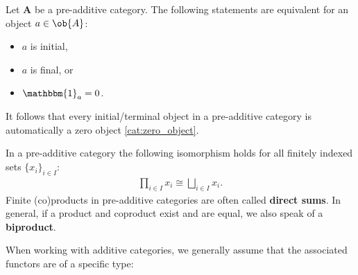     \begin{property}
        Let $\mathbf{A}$ be a pre-additive category. The following statements are equivalent for an object $a\in\ob{A}$:
        \begin{itemize}
            \item $a$ is initial,
            \item $a$ is final, or
            \item $\mathbbm{1}_a = 0$.
        \end{itemize}
        It follows that every initial/terminal object in a pre-additive category is automatically a zero object \ref{cat:zero_object}.
    \end{property}
    \begin{property}[Biproducts]
        In a pre-additive category the following isomorphism holds for all finitely indexed sets $\{x_i\}_{i\in I}$:
        \begin{gather}
            \prod_{i\in I}x_i \cong \bigsqcup_{i\in I}x_i.
        \end{gather}
        Finite (co)products in pre-additive categories are often called \textbf{direct sums}. In general, if a product and coproduct exist and are equal, we also speak of a \textbf{biproduct}.
    \end{property}


    When working with additive categories, we generally assume that the associated functors are of a specific type:

